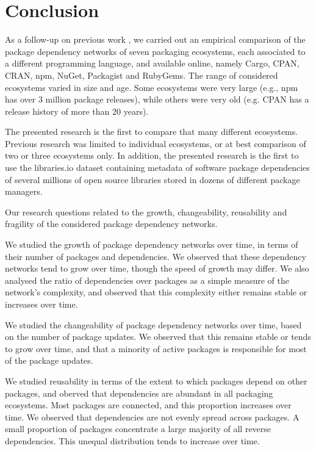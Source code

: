 \documentclass[smallextended]{svjour3}       %
\newcommand{\cran}{\textsf{CRAN}\xspace}
\newcommand{\cpan}{\textsf{CPAN}\xspace}
\newcommand{\rubygems}{\textsf{RubyGems}\xspace}
\newcommand{\packagist}{\textsf{Packagist}\xspace}
\newcommand{\cargo}{\textsf{Cargo}\xspace}
\newcommand{\nuget}{\textsf{NuGet}\xspace}
\newcommand{\npm}{\textsf{npm}\xspace}
\begin{document}
\section{Conclusion}\label{sec:conclusion}

As a follow-up on previous work \cite{Decan2017SANER}, we carried out an empirical comparison of the package dependency networks of seven packaging ecosystems, each associated to a different programming language, and available online, namely \cargo, \cpan, \cran, \npm, \nuget, \packagist and \rubygems. The range of considered ecosystems varied in size and age. Some ecosystems were very large (e.g., \npm has over 3 million package releases), while others were very old (e.g. \cpan has a release history of more than 20 years). 

The presented research is the first to compare that many different ecosystems. Previous research was limited to individual ecosystems, or at best comparison of two or three ecosystems only. In addition, the presented research is the first to use the \textsf{libraries.io} dataset containing metadata of software package dependencies of several millions of open source libraries stored in dozens of different package managers.


Our research questions related to the growth, changeability, reusability and fragility of the considered package dependency networks.

\noindent We studied the growth of package dependency networks over time, in terms of their number of packages and dependencies. We observed that these dependency networks tend to grow over time, though the speed of growth may differ. We also analysed the ratio of dependencies over packages as a simple measure of the network's complexity, and observed that this complexity either remains stable or increases over time.

\noindent We studied the changeability of package dependency networks over time, based on the number of package updates. We observed that this remains stable or tends to grow over time, and that a minority of active packages is responsible for most of the package updates. 

\noindent We studied reusability in terms of the extent to which packages depend on other packages, and oberved that dependencies are abundant in all packaging ecosystems. Most packages are connected, and this proportion increases over time. We observed that dependencies are not evenly spread across packages. A small proportion of packages concentrate a large majority of all reverse dependencies. This unequal distribution tends to increase over time. 
\end{document}
